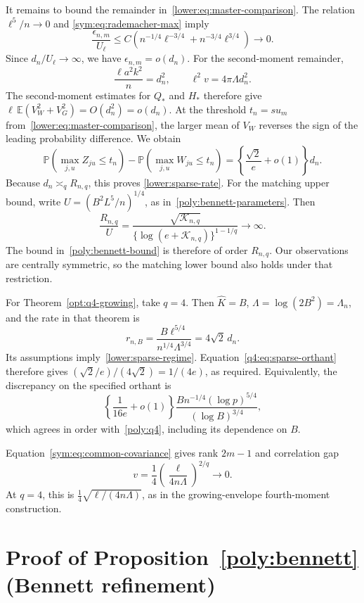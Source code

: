 \documentclass[11pt,letterpaper]{article}
\newenvironment{recovered}{\color{magenta}}{}
\theoremstyle{remark}
\newcommand{\E}{\mathbb E}
\newcommand{\Pp}{\mathbb P}
\begin{document}
It remains to bound the remainder
in~\eqref{lower:eq:master-comparison}. The relation \(\ell^5/n\to0\) and
\eqref{sym:eq:rademacher-max} imply
\[
 \frac{\epsilon_{n,m}}{U_\ell}
 \le C\left(n^{-1/4}\ell^{-3/4}
             +n^{-3/4}\ell^{3/4}\right)\longrightarrow0.
\]
Since \(d_n/U_\ell\to\infty\), we have \(\epsilon_{n,m}=o(d_n)\).
For the second-moment remainder,
\[
 \frac{\ell a^2k^2}{n}=d_n^2,\qquad
 \ell^2v=4\pi\Lambda d_n^2.
\]
\begin{recovered}
The second-moment estimates for \(Q_*\) and \(H_*\) therefore give
\(\ell\,\E(V_W^2+V_G^2)=O(d_n^2)=o(d_n)\).
At the threshold \(t_n=su_m\) from~\eqref{lower:eq:master-comparison},
the larger mean of \(V_W\) reverses the sign of the leading
probability difference. We obtain
\end{recovered}
\begin{equation}
 \Pp(\max_{j,u}Z_{ju}\le t_n)-\Pp(\max_{j,u}W_{ju}\le t_n)
 =\left\{\frac{\sqrt2}{e}+o(1)\right\}d_n.
 \label{q4:eq:sparse-orthant}
\end{equation}
Because \(d_n\asymp_q R_{n,q}\), this proves
\eqref{lower:sparse-rate}. For the matching upper bound, write
\(U=(B^2L^5/n)^{1/4}\), as in~\eqref{poly:bennett-parameters}.
Then
\[
 \frac{R_{n,q}}{U}
 =\frac{\sqrt{\mathcal K_{n,q}}}
        {\{\log(e+\mathcal K_{n,q})\}^{1-1/q}}\longrightarrow\infty.
\]
The bound in~\eqref{poly:bennett-bound} is therefore of order
\(R_{n,q}\). Our observations are centrally symmetric, so the
matching lower bound also holds under that restriction.

For Theorem~\ref{opt:q4-growing}, take \(q=4\).
Then \(\widehat K=B\), \(\Lambda=\log(2B^2)=\Lambda_n\), and
the rate in that theorem is
\[
 r_{n,B}=\frac{B\ell^{5/4}}{n^{1/4}\Lambda^{3/4}}
         =4\sqrt2\,d_n.
\]
Its assumptions imply~\eqref{lower:sparse-regime}.
Equation~\eqref{q4:eq:sparse-orthant} therefore gives
\((\sqrt2/e)/(4\sqrt2)=1/(4e)\), as required. Equivalently, the discrepancy on the
specified orthant is
\[
 \left\{\frac1{16e}+o(1)\right\}
 \frac{B n^{-1/4}(\log p)^{5/4}}{(\log B)^{3/4}},
\]
which agrees in order with~\eqref{poly:q4}, including its dependence on \(B\).

Equation~\eqref{sym:eq:common-covariance} gives rank \(2m-1\)
and correlation gap
\[
 v=\frac14\left(\frac{\ell}{4n\Lambda}\right)^{2/q}\to0.
\]
At \(q=4\), this is
\(\frac14\sqrt{\ell/(4n\Lambda)}\), as in the growing-envelope
fourth-moment construction.

\section{Proof of Proposition~\ref*{poly:bennett} (Bennett refinement)}\label{app:bennett}
\end{document}

